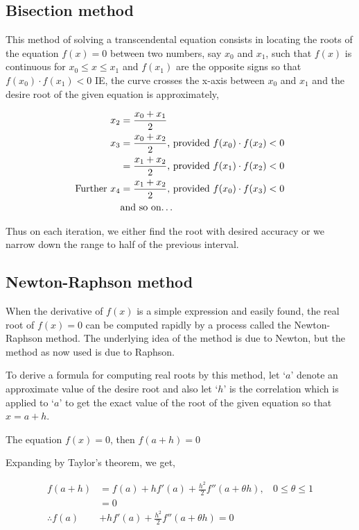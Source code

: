 \documentclass[11pt, a4paper]{article}
\begin{document}
\subsection{Bisection method}
This method of solving a transcendental equation consists in locating the roots of the equation $f(x)=0$ between two numbers, say $x_0$ and $x_1$, such that $f(x)$ is continuous for $x_0\le x \le x_1$ and $f(x_1)$ are the opposite signs so that $f(x_0)\cdot f(x_1) < 0$ IE, the curve crosses the
x-axis between $x_0$ and $x_1$ and the desire root of the given equation is approximately,

\begin{align*}
  x_2 &= \frac{x_0+x_1}{2}\\
  x_3 &= \frac{x_0+x_2}{2}\text{, provided }f(x_0)\cdot f(x_2)<0\\
      &= \frac{x_1+x_2}{2}\text{, provided }f(x_1)\cdot f(x_2)<0\\
  \text{Further } x_4 &= \frac{x_1+x_2}{2}\text{, provided }f(x_0)\cdot f(x_3)<0\\
  &\text{and so on\dots}
\end{align*}

Thus on each iteration, we either find the root with desired accuracy or we narrow down the range to half of the previous interval.

\subsection{Newton-Raphson method}
When the derivative of $f(x)$ is a simple expression and easily found, the real root of $f(x)=0$ can be computed rapidly by a process called the Newton-Raphson method. The underlying idea of the method is due to Newton, but the method as now used is due to Raphson.

To derive a formula for computing real roots by this method, let `$a$' denote an approximate value of the desire root and also let `$h$' is the correlation which is applied to `$a$' to get the exact value of the root of the given equation so that $x=a+h$.

The equation $f(x)=0$, then $f(a+h)=0$

Expanding by Taylor's theorem, we get,

\begin{align*}
  f(a+h) &= f(a)+hf'(a)+\frac{h^2}{2}f''(a+\theta h), \ \ \ \ 0\le\theta\le 1\\
         &= 0\\
  \therefore f(a)&+hf'(a)+\frac{h^2}{2}f''(a+\theta h) = 0
\end{align*}
\end{document}
